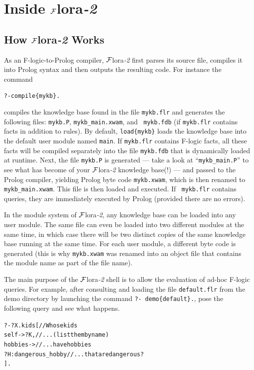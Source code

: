 \documentclass[11pt]{article}
\newcommand{\FLORA}{{\mbox{\sc ${\cal F}${lora}\rm\emph{-2}}}\xspace}
\newcommand{\FLSYSTEM}{\FLORA}
\newcommand{\flrext}{flr\xspace}
\newcommand{\fl}{\mbox{F-logic}\xspace}
\newcommand{\ofile}{xwam}
\begin{document}
{\newpage
\section{Inside \FLSYSTEM}

\subsection{How \FLSYSTEM Works}


As an \fl-to-Prolog compiler, \FLSYSTEM first parses its source file,
compiles it into Prolog syntax and then outputs the resulting code. For
instance the command 
\begin{alltt}
    ?- compile\{mykb\}.
\end{alltt}
compiles the knowledge base found in the file {\tt mykb.\flrext} and generates the
following files: {\tt mykb.P}, {\tt mykb\_main.\ofile}, and {\tt
  mykb.fdb} (if {\tt mykb.\flrext} contains facts in addition to rules).
By default, {\tt load\{mykb\}} loads the knowledge base into the default user
module named {\tt main}. If {\tt mykb.\flrext} contains \fl facts, all these
facts will be compiled separately into the file {\tt mykb.fdb} that is
dynamically loaded at runtime.  Next, the file {\tt mykb.P} is generated
--- take a look at ``{\tt mykb\_main.P}'' to see what has become of your
\FLSYSTEM knowledge base(!) --- and passed to the Prolog compiler, yielding Prolog byte
code {\tt mykb.\ofile}, which is then renamed to {\tt
  mykb\_main.\ofile}. This file is then loaded and executed.  If {\tt
  mykb.\flrext} contains queries, they are immediately executed by Prolog
(provided there are no errors).

In the module system of \FLSYSTEM, any knowledge base can be loaded into any
user module. The same file can even be loaded into two different
modules at the same time, in which case there will be two distinct copies
of the same knowledge base running at the same time. For each user module, a different
byte code is generated (this is why {\tt mykb.\ofile} was renamed into an
object file that contains the module name as part of the file name).

The main purpose of the \FLSYSTEM shell is to allow the evaluation
of ad-hoc \fl queries. For example, after consulting and loading the
file \texttt{default.\flrext} from the demo directory by launching
the command \texttt{?-~demo\{default\}.}, pose the following query
and see what happens.
\begin{alltt}
 \hspace*{4mm}   ?-  ?X.kids[                       // Whose kids\\
 \hspace*{15mm}           self -> ?K,             // ... (list them by name)\\
 \hspace*{15mm}           hobbies ->              // ... have hobbies \\
 \hspace*{15mm}             ?H:dangerous\_hobby    // ... that are dangerous? \\
 \hspace*{10mm}           ]. 
\end{alltt}


}
\end{document}
